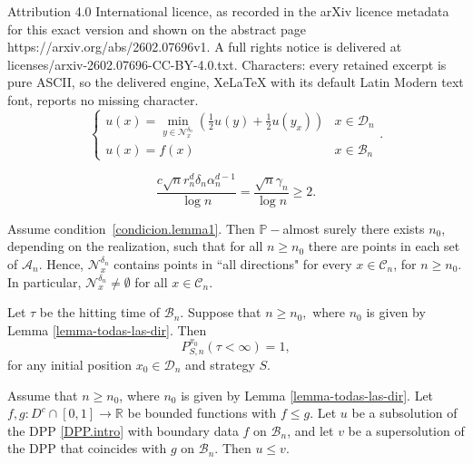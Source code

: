 \documentclass[10pt,a4paper]{amsart}
\newcommand{\B}{\mathscr{B}}
\newcommand{\C}{{\mathcal C}}
\newcommand{\Domain}{\mathcal{D}}
\newcommand{\Nc}{{\mathcal N}}
\newcommand{\R}{{\mathbb R}}
\renewcommand{\P}{\mathbb{P}}
\begin{document}
Attribution 4.0 International licence, as recorded in the arXiv licence metadata for this exact version and shown on the abstract page https://arxiv.org/abs/2602.07696v1. A full rights notice is delivered at licenses/arxiv-2602.07696-CC-BY-4.0.txt. Characters: every retained excerpt is pure ASCII, so the delivered engine, XeLaTeX with its default Latin Modern text font, reports no missing character.
\begin{equation}
\label{DPP.intro}
\begin{cases}
\displaystyle u(x)=\min\limits_{y\in \Nc_x^{\delta_n}} 
\left(
\frac{1}{2} 
u(y) 
+
\frac{1}{2}
u(y_x) 
\right)
& x\in \Domain_n \\
u(x)=f(x)
& x\in \B_n
\end{cases} 
.
\end{equation}

\begin{equation}
\label{condicion.lemma1}
\frac{c\sqrt{n} r_n^d \delta_n \alpha_n^{d-1}}{\log n} 
= \frac{\sqrt{n} \gamma_n}{\log n}\geq 2.
\end{equation}

\begin{lemma}
\label{lemma-todas-las-dir}
Assume condition~\eqref{condicion.lemma1}.
Then $\P-$almost surely there exists $n_0$, depending on the realization, such that for all $n \ge n_0$ there are points in each set of $\mathcal{A}_n$. 
Hence, $\Nc_x^{\delta_n}$ contains points in ``all directions" for every $x \in \C_n$, for $n\ge n_0$. 
In particular, $\Nc_x^{\delta_n} \neq \emptyset$ for all $x \in \C_n$.
\end{lemma}

\begin{lemma}
\label{lema-juego-termina}
Let $\tau$ be the hitting time of $\B_n$.
Suppose that $n\geq n_0,$ where $n_0$ is given by Lemma \ref{lemma-todas-las-dir}.
Then $$P_{S,n}^{x_0}(\tau < \infty)=1,$$ for any initial position $x_0\in\Domain_n$ and strategy $S$.
\end{lemma}

\begin{lemma}
\label{lema-cp} 
Assume that $n\geq n_0$, where $n_0$ is given by Lemma \ref{lemma-todas-las-dir}.
Let $f, g \colon D^c \cap [0,1] \to \R$ be bounded functions with $f \leq g$.
Let $u$ be a subsolution of the DPP \eqref{DPP.intro} with boundary data $f$ on $\B_n$, and let $v$ be a supersolution of the DPP that coincides with $g$ on $\B_n$.
Then $u \leq v$.
\end{lemma}
\end{document}
